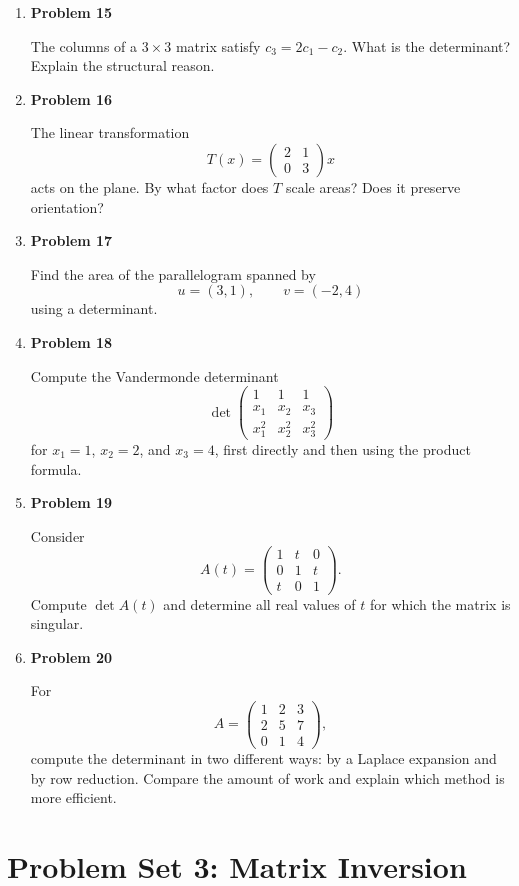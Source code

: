 \begin{enumerate}
\item \textbf{Problem 15}\par
The columns of a \(3\times3\) matrix satisfy \(c_3=2c_1-c_2\). What is the determinant? Explain the structural reason.

\item \textbf{Problem 16}\par
The linear transformation
\[
T(x)=
\begin{pmatrix}
2&1\\
0&3
\end{pmatrix}x
\]
acts on the plane. By what factor does \(T\) scale areas? Does it preserve orientation?

\item \textbf{Problem 17}\par
Find the area of the parallelogram spanned by
\[
u=(3,1),
\qquad
v=(-2,4)
\]
using a determinant.

\item \textbf{Problem 18}\par
Compute the Vandermonde determinant
\[
\det\begin{pmatrix}
1&1&1\\
x_1&x_2&x_3\\
x_1^2&x_2^2&x_3^2
\end{pmatrix}
\]
for \(x_1=1\), \(x_2=2\), and \(x_3=4\), first directly and then using the product formula.

\item \textbf{Problem 19}\par
Consider
\[
A(t)=\begin{pmatrix}
1&t&0\\
0&1&t\\
t&0&1
\end{pmatrix}.
\]
Compute \(\det A(t)\) and determine all real values of \(t\) for which the matrix is singular.

\item \textbf{Problem 20}\par
For
\[
A=\begin{pmatrix}
1&2&3\\
2&5&7\\
0&1&4
\end{pmatrix},
\]
compute the determinant in two different ways: by a Laplace expansion and by row reduction. Compare the amount of work and explain which method is more efficient.
\end{enumerate}

\section{Problem Set 3: Matrix Inversion}


